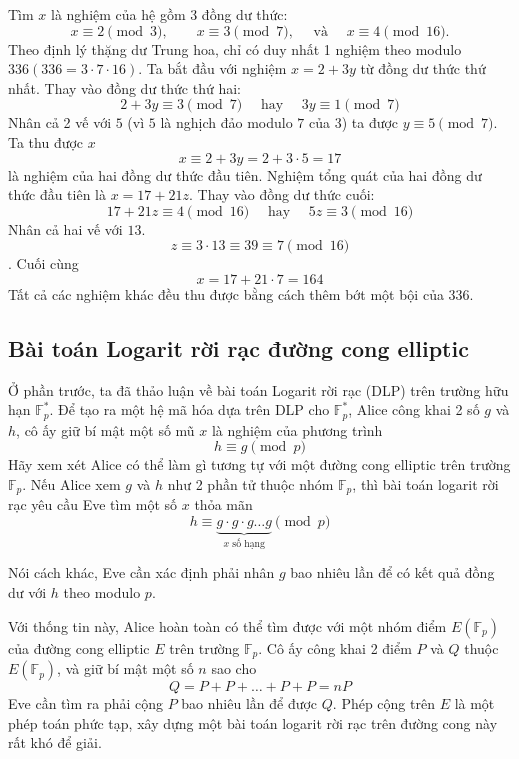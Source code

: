\begin{example}
	Tìm $x$ là nghiệm của hệ gồm 3 đồng dư thức:
	\begin{equation}
		x \equiv 2 \pmod{3}, \quad \quad x \equiv 3 \pmod{7}, \quad \text{ và } \quad x \equiv 4 \pmod{16}.
	\end{equation}
	Theo định lý thặng dư Trung hoa, chỉ có duy nhất 1 nghiệm theo modulo $336 (336 = 3 \cdot 7 \cdot 16)$.
	Ta bắt đầu với nghiệm $x=2 +3y $ từ đồng dư thức thứ nhất. Thay vào đồng dư thức thứ hai:
	$$2 + 3y \equiv 3 \pmod{7} \quad \text{ hay } \quad 3y \equiv 1 \pmod{7}$$
	Nhân cả 2 vế với $5$ (vì $5$ là nghịch đảo modulo $7$ của $3$) ta được $y \equiv 5 \pmod{7}$. Ta thu được $x$
	$$ x \equiv 2 + 3y = 2 + 3 \cdot 5 = 17$$
	là nghiệm của hai đồng dư thức đầu tiên.
	Nghiệm tổng quát của hai đồng dư thức đầu tiên là $x=17 + 21z$. Thay vào đồng dư thức cuối:
	$$ 17 + 21z \equiv 4 \pmod{16} \quad \text{ hay } \quad 5z \equiv 3 \pmod{16}$$
	Nhân cả hai vế với $13$.
	$$ z \equiv 3 \cdot 13 \equiv 39 \equiv 7 \pmod{16}$$.
	Cuối cùng
	$$ x = 17 + 21 \cdot 7 = 164$$
	Tất cả các nghiệm khác đều thu được bằng cách thêm bớt một bội của $336$.
\end{example}
\subsection{Bài toán Logarit rời rạc đường cong elliptic}
Ở phần trước, ta đã thảo luận về bài toán Logarit rời rạc (DLP) trên trường hữu hạn $\mathbb{F}^*_p$.
Để tạo ra một hệ mã hóa dựa trên DLP cho $\mathbb{F}^*_p$, Alice công khai 2 số $g$ và $h$, cô ấy giữ bí mật một số mũ $x$ là nghiệm của phương trình
$$ h \equiv g \pmod{p} $$
Hãy xem xét Alice có thể làm gì tương tự với một đường cong elliptic trên trường $\mathbb{F}_p$.  Nếu Alice xem $g$ và $h$ như 2 phần tử thuộc nhóm $\mathbb{F}_p$,
thì bài toán logarit rời rạc yêu cầu Eve tìm một số $x$ thỏa mãn
$$ h \equiv \underbrace{ g \cdot g \cdot g \ldots g }_{\text{$x$ số hạng}} \pmod{p} $$

Nói cách khác, Eve cần xác định phải nhân $g$ bao nhiêu lần để có kết quả đồng dư với $h$ theo modulo $p$.

Với thống tin này, Alice hoàn toàn có thể tìm được với một nhóm điểm $E(\mathbb{F}_p)$ của đường cong elliptic $E$ trên trường $\mathbb{F}_p$.
Cô ấy công khai 2 điểm $P$ và $Q$ thuộc $E(\mathbb{F}_p)$, và giữ bí mật một số $n$ sao cho
$$ Q = P+P+ \ldots +P+P = nP$$
Eve cần tìm ra phải cộng $P$ bao nhiêu lần để được $Q$. Phép cộng trên $E$ là một phép toán phức tạp, xây dựng một bài toán logarit rời rạc trên đường cong này rất khó để giải.

